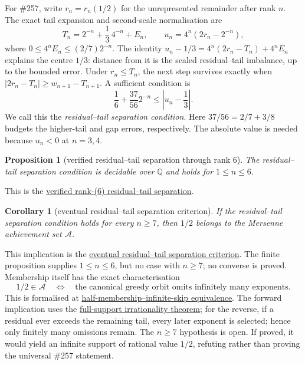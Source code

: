 \documentclass[11pt]{article}
\newcommand{\commit}{312b96c0d149ed466725c62d4ef24cfc91bca34e}
\newcommand{\repobase}{https://github.com/wcook04/plectis-lean-erdos249-257/blob/\commit}
\newcommand{\PK}{Erdos249257}
\newcommand{\lword}[4]{\href{\repobase/\PK/#1\#L#2}{#4}}
\newtheorem{proposition}[theorem]{Proposition}
\newtheorem{corollary}[theorem]{Corollary}
\theoremstyle{definition}
\theoremstyle{remark}
\newcommand{\Q}{\mathbb{Q}}
\begin{document}
For \#257, write \(r_n=r_n(1/2)\) for the unrepresented remainder after rank
\(n\).  The exact tail expansion and second-scale normalisation are
\[
 T_n=2^{-n}+\frac13\,4^{-n}+E_n,
 \qquad u_n=4^n(2r_n-2^{-n}),
\]
where \(0\le4^nE_n\le(2/7)2^{-n}\).  The identity
\(u_n-1/3=4^n(2r_n-T_n)+4^nE_n\) explains the centre \(1/3\): distance from it
is the scaled residual--tail imbalance, up to the bounded error.  Under
\(r_n\le T_n\), the next step survives exactly when
\(\lvert2r_n-T_n\rvert\ge w_{n+1}-T_{n+1}\).  A sufficient condition is
\[
  \frac16+\frac{37}{56}2^{-n}\le \left|u_n-\frac13\right|.
\]
We call this the \emph{residual--tail separation condition}.  Here
\(37/56=2/7+3/8\) budgets the higher-tail and gap errors, respectively.
The absolute value is needed because \(u_n<0\) at \(n=3,4\).

\begin{proposition}[verified residual--tail separation through rank \(6\)]\label{res:secondfrontier}
The residual--tail separation condition is decidable over $\Q$ and holds for
$1\le n\le6$.
\end{proposition}
\noindent This is the
\lword{GreedyAchievementSet.lean}{2723}{halfSecondChannelSeparatedRat_of_pos_le_six}{verified rank-(6) residual--tail separation}.

\begin{corollary}[eventual residual--tail separation criterion]
\label{res:secondcriterion}
If the residual--tail separation condition holds for every \(n\ge7\), then
\(1/2\) belongs to the Mersenne achievement set \(\mathcal A\).
\end{corollary}
\noindent This implication is the
\lword{GreedyAchievementSet.lean}{2901}{half_mem_mersenneAchievementSet_of_secondChannelSeparationRat_from_seven}{eventual residual--tail separation criterion}.
The finite proposition supplies \(1\le n\le6\), but no case with \(n\ge7\);
no converse is proved.  Membership itself has the exact characterisation
\[
  1/2\in\mathcal A
  \quad\Longleftrightarrow\quad
  \text{the canonical greedy orbit omits infinitely many exponents}.
\]
This is formalised at
\lword{GreedyAchievementSet.lean}{2514}{half_mem_mersenneAchievementSet_iff_greedySkippedSupport_infinite}{half-membership--infinite-skip equivalence}.
The forward implication uses the
\hyperref[res:full]{full-support irrationality theorem}; for the reverse,
if a residual ever exceeds the remaining tail, every later exponent is
selected; hence only finitely many omissions remain.  The \(n\ge7\) hypothesis
is open.  If proved, it would yield an infinite support of rational value
\(1/2\), refuting rather than proving the universal \#257 statement.
\end{document}
